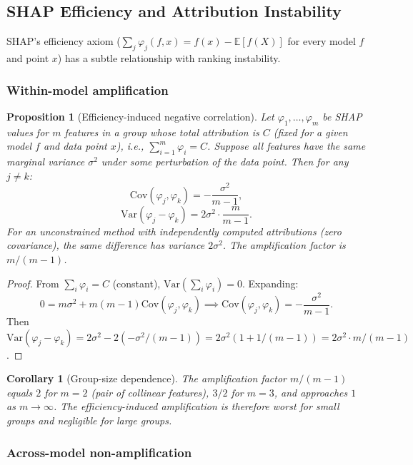 \documentclass{article}
\newtheorem{corollary}[theorem]{Corollary}
\newtheorem{proposition}[theorem]{Proposition}
\newcommand{\E}{\mathbb{E}}
\begin{document}
\subsection{SHAP Efficiency and Attribution Instability}

SHAP's efficiency axiom ($\sum_j \varphi_j(f,x) = f(x) - \E[f(X)]$ for every model $f$ and point $x$) has a subtle relationship with ranking instability.

\subsubsection{Within-model amplification}

\begin{proposition}[Efficiency-induced negative correlation]
\label{prop:efficiency-negcor}
Let $\varphi_1, \ldots, \varphi_m$ be SHAP values for $m$ features in a
group whose total attribution is $C$ (fixed for a given model $f$ and
data point $x$), i.e., $\sum_{i=1}^m \varphi_i = C$.  Suppose all
features have the same marginal variance $\sigma^2$ under some
perturbation of the data point.  Then for any $j \neq k$:
\[
  \mathrm{Cov}(\varphi_j, \varphi_k) = -\frac{\sigma^2}{m-1},
\]
\[
  \mathrm{Var}(\varphi_j - \varphi_k)
  = 2\sigma^2 \cdot \frac{m}{m-1}.
\]
For an unconstrained method with independently computed attributions
(zero covariance), the same difference has variance $2\sigma^2$.
The amplification factor is $m/(m-1)$.
\end{proposition}

\begin{proof}
From $\sum_i \varphi_i = C$ (constant), $\mathrm{Var}(\sum_i \varphi_i) = 0$.
Expanding:
\[
  0 = m\sigma^2 + m(m-1)\mathrm{Cov}(\varphi_j, \varphi_k)
  \implies \mathrm{Cov}(\varphi_j, \varphi_k) = -\frac{\sigma^2}{m-1}.
\]
Then $\mathrm{Var}(\varphi_j - \varphi_k) = 2\sigma^2 - 2(-\sigma^2/(m-1))
= 2\sigma^2(1 + 1/(m-1)) = 2\sigma^2 \cdot m/(m-1)$.
\end{proof}

\begin{corollary}[Group-size dependence]
\label{cor:groupsize}
The amplification factor $m/(m-1)$ equals $2$ for $m=2$ (pair of
collinear features), $3/2$ for $m=3$, and approaches $1$ as
$m \to \infty$.  The efficiency-induced amplification is therefore
worst for small groups and negligible for large groups.
\end{corollary}

\subsubsection{Across-model non-amplification}
\end{document}

